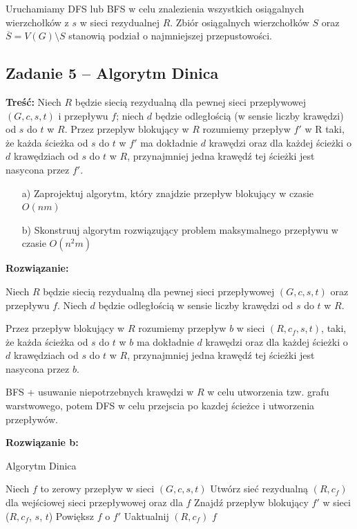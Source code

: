 Uruchamiamy DFS lub BFS w celu znalezienia wszystkich osiągalnych wierzchołków 
z $s$ w sieci rezydualnej $R$. Zbiór osiągalnych wierzchołków $S$ oraz 
$\overline{S} = V(G) \setminus S$ stanowią podział o najmniejszej 
przepustowości.

\subsection{Zadanie 5 -- Algorytm Dinica}
\textbf{Treść: } Niech $R$ będzie siecią rezydualną 
dla pewnej sieci przeplywowej $(G, c, s, t)$ i przepływu $f$; 
niech $d$ będzie
odległością (w sensie liczby krawędzi) od $s$ do $t$ w $R$. 
Przez przeplyw blokujący w $R$ rozumiemy przepływ $f'$ w R taki,
że każda ścieżka od $s$ do $t$ w $f'$ ma dokładnie 
$d$ krawędzi oraz dla każdej ścieżki o $d$ krawędziach od $s$ do $t$ w $R$,
przynajmniej jedna krawędź tej ścieżki jest nasycona przez $f'$.
\begin{itemize}
	\item[a)] Zaprojektuj algorytm, który znajdzie przepływ blokujący w czasie $O(nm)$
	\item[b)] Skonstruuj algorytm rozwiązujący problem maksymalnego przepływu w czasie $O(n^2m)$
\end{itemize}
\textbf{Rozwiązanie: }

\begin{defi}
	Niech $R$ będzie siecią rezydualną dla pewnej sieci przepływowej
	$(G, c, s, t)$ oraz przepływu $f$. Niech $d$ będzie odległością w sensie
	liczby krawędzi od $s$ do $t$ w $R$.
	
	Przez przepływ blokujący w $R$ rozumiemy przepływ $b$ w sieci
	$(R, c_f, s, t)$, taki, że każda ścieżka od $s$ do $t$ 
	w $b$ ma dokładnie $d$ krawędzi oraz dla każdej ścieżki o $d$ 
	krawędziach od $s$ do $t$ w $R$, przynajmniej jedna krawędź tej ścieżki
	jest nasycona przez $b$.
\end{defi}

BFS + usuwanie niepotrzebnych krawędzi w $R$ w celu utworzenia tzw. 
grafu warstwowego, potem DFS w celu przejscia po kazdej ścieżce
i utworzenia przepływów.

\textbf{Rozwiązanie b: }

\begin{algorithm}[H]
	\caption{Algorytm Dinica}
	\begin{algorithmic}[1]
		\State Niech $f$ to zerowy przepływ w sieci $(G,c,s,t)$
		\State Utwórz sieć rezydualną $(R, c_f)$ dla wejściowej 
		sieci przepływowej oraz dla $f$ 
		\State Znajdź przepływ blokujący $f'$ w sieci ($R, c_f$, $s$, $t$)
		\State Powiększ $f$ o $f'$
		\State Uaktualnij $(R, c_f)$
		\EndWhile
		\State \Return $f$
		\EndProcedure
	\end{algorithmic}
	\label{zad45}
\end{algorithm}

